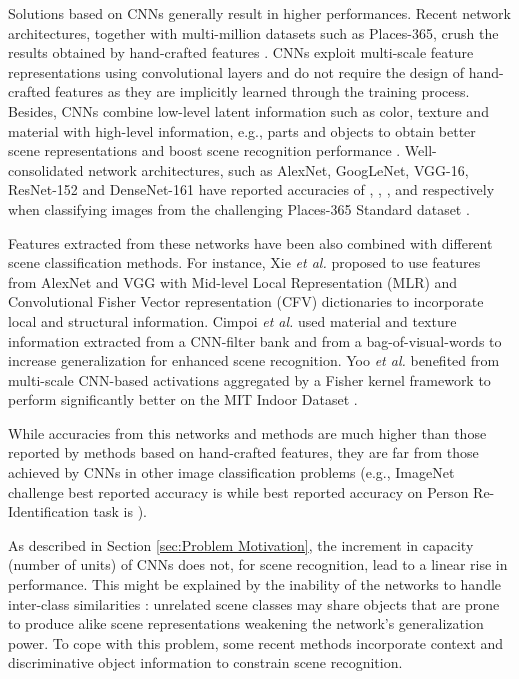 \documentclass[review, 3p, sort&compress]{elsarticle}
\begin{document}
Solutions based on CNNs generally result in higher performances. Recent network architectures, together with multi-million datasets such as Places-365, crush the results obtained by hand-crafted features \cite{zhou2018places}. CNNs exploit multi-scale feature representations using convolutional layers and do not require the design of hand-crafted features as they are implicitly learned through the training process. Besides, CNNs combine low-level latent information such as color, texture and material with high-level information, e.g., parts and objects to obtain better scene representations and boost scene recognition performance \cite{bau2017network}. Well-consolidated network architectures, such as AlexNet, GoogLeNet, VGG-16, ResNet-152 and DenseNet-161 have reported accuracies of , , ,  and  respectively when classifying images from the challenging Places-365 Standard dataset \cite{zhou2018places}.

Features extracted from these networks have been also combined with different scene classification methods. For instance, Xie \textit{et al.} \cite{xie2015hybrid} proposed to use features from AlexNet and VGG with Mid-level Local Representation (MLR) and Convolutional Fisher Vector representation (CFV) dictionaries to incorporate local and structural information. Cimpoi \textit{et al.} \cite{cimpoi2015deep} used material and texture information extracted from a CNN-filter bank and from a bag-of-visual-words to increase generalization for enhanced scene recognition. Yoo \textit{et al.} \cite{yoo2014fisher} benefited from multi-scale CNN-based activations aggregated by a Fisher kernel framework to perform significantly better on the MIT Indoor Dataset \cite{quattoni2009recognizing}.

While accuracies from this networks and methods are much higher than those reported by methods based on hand-crafted features, they are far from those achieved by CNNs in other image classification problems (e.g., ImageNet challenge best reported accuracy is  \cite{mahajan2018exploring} while best reported accuracy on Person Re-Identification task is  \cite{quan2019auto}). 

As described in Section \ref{sec:Problem Motivation}, the increment in capacity (number of units) of CNNs does not, for scene recognition, lead to a linear rise in performance. This might be explained by the inability of the networks to handle inter-class similarities \cite{cheng2018scene}: unrelated scene classes may share objects that are prone to produce alike scene representations weakening the network's generalization power. To cope with this problem, some recent methods incorporate context and discriminative object information to constrain scene recognition. 
\end{document}
